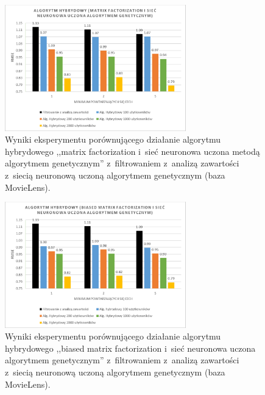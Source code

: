 \documentclass[twoside]{iisthesis}
\begin{document}
		\begin{figure}
			\centering
			\includegraphics[width=0.7\textwidth]{ml_exphybrid1_7}			
			\caption{Wyniki eksperymentu porównującego działanie algorytmu hybrydowego ,,matrix factorization i~sieć neuronowa uczona metodą algorytmem genetycznym'' z~filtrowaniem z~analizą zawartości z~siecią neuronową uczoną algorytmem genetycznym (baza MovieLens).}
			\label{fig:ml_exphybrid1_7}
		\end{figure}
		
		\begin{figure}
			\centering
			\includegraphics[width=0.7\textwidth]{ml_exphybrid1_8}			
			\caption{Wyniki eksperymentu porównującego działanie algorytmu hybrydowego ,,biased matrix factorization i~sieć neuronowa uczona algorytmem genetycznym'' z~filtrowaniem z~analizą zawartości z~siecią neuronową uczoną algorytmem genetycznym (baza MovieLens).}
			\label{fig:ml_exphybrid1_8}
		\end{figure}
		
\end{document}
